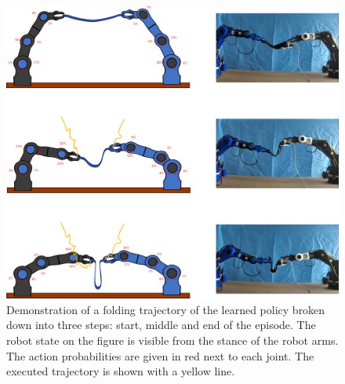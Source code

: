 \documentclass[\home/main.tex]{subfiles}
\begin{document}

\begin{figure}[htb]
\centering
\includegraphics[width=\textwidth, keepaspectratio]{figures/robot_success_merge_with_pics.png}
\caption{Demonstration of a folding trajectory of the learned policy broken down into three steps: start, middle and end of the episode. The robot state on the figure is visible from the stance of the robot arms. The action probabilities are given in red next to each joint. The executed trajectory is shown with a yellow line.  }
\label{fig:robot_success_merge}
\end{figure}
\end{document}
